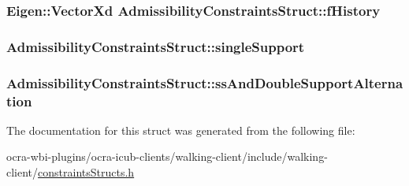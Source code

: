 \hypertarget{structAdmissibilityConstraintsStruct_adadbcf470bb052caccee15b81000684a}{
\subsubsection[{f\-History}]{\setlength{\rightskip}{0pt plus 5cm}\-Eigen\-::\-Vector\-Xd {\bf \-Admissibility\-Constraints\-Struct\-::f\-History}}}\label{structAdmissibilityConstraintsStruct_adadbcf470bb052caccee15b81000684a}
\hypertarget{structAdmissibilityConstraintsStruct_a40fb404909b4fcee9e31e1dbf566a554}{
\subsubsection[{single\-Support}]{ {\bf \-Admissibility\-Constraints\-Struct\-::single\-Support}}}\label{structAdmissibilityConstraintsStruct_a40fb404909b4fcee9e31e1dbf566a554}
\hypertarget{structAdmissibilityConstraintsStruct_a387b2106272e3148e1fd4dbde6dedb3e}{
\subsubsection[{ss\-And\-Double\-Support\-Alternation}]{ {\bf \-Admissibility\-Constraints\-Struct\-::ss\-And\-Double\-Support\-Alternation}}}\label{structAdmissibilityConstraintsStruct_a387b2106272e3148e1fd4dbde6dedb3e}


\-The documentation for this struct was generated from the following file\-:\begin{DoxyCompactItemize}
\item 
ocra-\/wbi-\/plugins/ocra-\/icub-\/clients/walking-\/client/include/walking-\/client/\hyperlink{constraintsStructs_8h}{constraints\-Structs.\-h}\end{DoxyCompactItemize}
